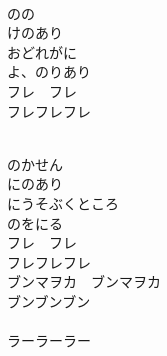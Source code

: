 \documentclass[10pt,b5j]{tarticle} %
\begin{document}
\vspace{1.5em} %
\newcommand{\linespace}{0.5em} %
\newcommand{\blocksize}{0.5\hsize} %
\newcommand{\itemmargin}{3em} %
\begin{enumerate} %
    \setlength{\itemindent}{\itemmargin} %
    \begin{minipage}[c]{\blocksize}
    
        \vspace{\linespace}
        \item~\\
        のの\\
        けのあり\\
        おどれがに\\
        よ、のりあり\\
        フレ　フレ\\
        フレフレフレ
        
    \end{minipage}
    \begin{minipage}[c]{\blocksize}
        
        \vspace{\linespace}
        \item~\\
        のかせん\\
        にのあり\\
        にうそぶくところ\\
        のをにる\\
        フレ　フレ\\
        フレフレフレ\\
        ブンマヲカ　ブンマヲカ\\
        ブンブンブン\\
        　\\
        ラーラーラー
        
    \end{minipage}
    \begin{minipage}[c]{\blocksize}
        

\end{minipage}
\end{enumerate}
\end{document}
